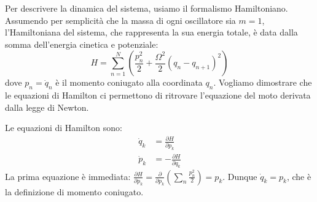 % 
Per descrivere la dinamica del sistema, usiamo il formalismo Hamiltoniano. Assumendo per semplicità che la massa di ogni oscillatore sia $m=1$, l'Hamiltoniana del sistema, che rappresenta la sua energia totale, è data dalla somma dell'energia cinetica e potenziale:
\begin{equation}
    H = \sum_{n=1}^{N} \left( \frac{p_n^2}{2} + \frac{\Omega^2}{2}(q_n - q_{n+1})^2 \right)
\end{equation}
dove $p_n = \dot{q}_n$ è il momento coniugato alla coordinata $q_n$. Vogliamo dimostrare che le equazioni di Hamilton ci permettono di ritrovare l'equazione del moto derivata dalla legge di Newton.

Le equazioni di Hamilton sono:
\begin{align}
    \dot{q}_k &= \frac{\partial H}{\partial p_k} \\
    \dot{p}_k &= -\frac{\partial H}{\partial q_k}
\end{align}
La prima equazione è immediata: $\frac{\partial H}{\partial p_k} = \frac{\partial}{\partial p_k} \left( \sum_n \frac{p_n^2}{2} \right) = p_k$. Dunque $\dot{q}_k = p_k$, che è la definizione di momento coniugato.

